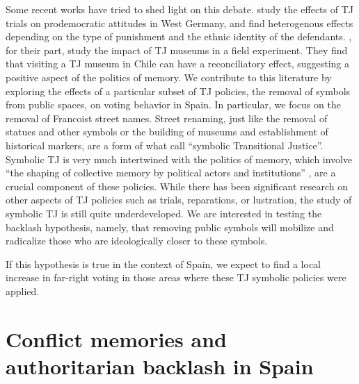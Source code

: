 \documentclass[12pt, notitlepage]{article}
\begin{document}
Some recent works have tried to shed light on this debate. \cite{Capoccia:2020aa} study the effects of TJ trials on prodemocratic attitudes in West Germany, and find heterogenous effects depending on the type of punishment and the ethnic identity of the defendants.
\cite{Balcells:2020aa}, for their part, study the impact of TJ museums in a field experiment. They find that visiting a TJ museum in Chile can have a reconciliatory effect, suggesting a positive aspect of the politics of memory.
We contribute to this literature by exploring the effects of a particular subset of TJ policies, the removal of symbols from public spaces, on voting behavior in Spain. In particular, we focus on the removal of Francoist street names. Street renaming, just like the removal of statues and other symbols or the building of museums and establishment of historical markers,\citep{Ward2021} are a form of what \citet{Aguilar:2011aa} call ``symbolic Transitional Justice''. Symbolic TJ is very much intertwined with the politics of memory, which involve ``the shaping of collective memory by political actors and institutions'' \citep[][176]{Zubrzycki:2020aa}, are a crucial component of these policies. While there has been significant research on other aspects of TJ policies such as trials, reparations, or lustration, the study of symbolic TJ is still quite underdeveloped. We are interested in testing the backlash hypothesis, namely, that removing public symbols will mobilize and radicalize those who are ideologically closer to these symbols.

If this hypothesis is true in the context of Spain, we expect to find a local increase in far-right voting in those areas where these TJ symbolic policies were applied.

\section*{Conflict memories and authoritarian backlash in Spain}

\end{document}
